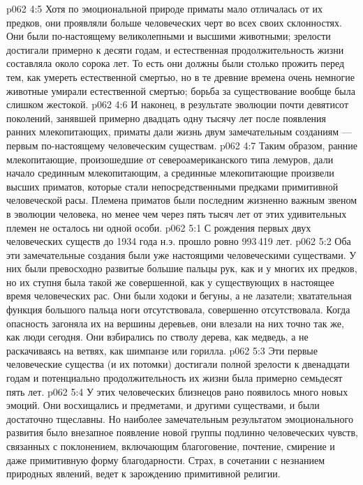 \vs p062 4:5 Хотя по эмоциональной природе приматы мало отличалась от их предков, они проявляли больше человеческих черт во всех своих склонностях. Они были по\hyp{}настоящему великолепными и высшими животными; зрелости достигали примерно к десяти годам, и естественная продолжительность жизни составляла около сорока лет. То есть они должны были столько прожить перед тем, как умереть естественной смертью, но в те древние времена очень немногие животные умирали естественной смертью; борьба за существование вообще была слишком жестокой.
\vs p062 4:6 И наконец, в результате эволюции почти девятисот поколений, занявшей примерно двадцать одну тысячу лет после появления ранних млекопитающих, приматы  дали жизнь двум замечательным созданиям --- первым по\hyp{}настоящему человеческим существам.
\vs p062 4:7 \pc Таким образом, ранние млекопитающие, произошедшие от североамериканского типа лемуров, дали начало срединным млекопитающим, а срединные млекопитающие произвели высших приматов, которые стали непосредственными предками примитивной человеческой расы. Племена приматов были последним жизненно важным звеном в эволюции человека, но менее чем через пять тысяч лет от этих удивительных племен не осталось ни одной особи.
\vs p062 5:1 С рождения первых двух человеческих существ до 1934 года н.э. прошло ровно 993\,419 лет.
\vs p062 5:2 Оба эти замечательные создания были уже настоящими человеческими существами. У них были превосходно развитые большие пальцы рук, как и у многих их предков, но их ступня была такой же совершенной, как у существующих в настоящее время человеческих рас. Они были ходоки и бегуны, а не лазатели; хватательная функция большого пальца ноги отсутствовала, совершенно отсутствовала. Когда опасность загоняла их на вершины деревьев, они влезали на них точно так же, как люди сегодня. Они взбирались по стволу дерева, как медведь, а не раскачиваясь на ветвях, как шимпанзе или горилла.
\vs p062 5:3 Эти первые человеческие существа (и их потомки) достигали полной зрелости к двенадцати годам и потенциально продолжительность их жизни была примерно семьдесят пять лет.
\vs p062 5:4 У этих человеческих близнецов рано появилось много новых эмоций. Они восхищались и предметами, и другими существами, и были достаточно тщеславны. Но наиболее замечательным результатом эмоционального развития было внезапное появление новой группы подлинно человеческих чувств, связанных с поклонением, включающим благоговение, почтение, смирение и даже примитивную форму благодарности. Страх, в сочетании с незнанием природных явлений, ведет к зарождению примитивной религии.
